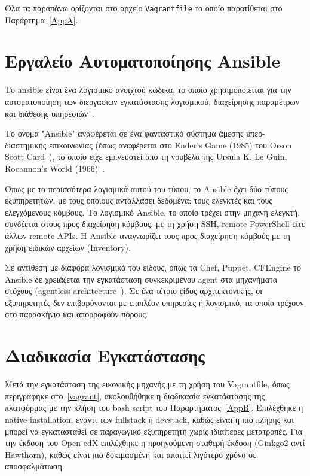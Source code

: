 \documentclass[12pt]{report}
\begin{document}
Όλα τα παραπάνω ορίζονται στο αρχείο \textlatin{\texttt{Vagrantfile}} το οποίο παρατίθεται στο Παράρτημα~\ref{AppA}.

\section{Εργαλείο Αυτοματοποίησης \textlatin{Ansible}}\label{ansible}
Το \textlatin{ansible} είναι ένα λογισμικό ανοιχτού κώδικα, το οποίο χρησιμοποιείται για την αυτοματοποίηση των διεργασιων εγκατάστασης λογισμικού, διαχείρησης παραμέτρων και διάθεσης υπηρεσιών~\cite{wikipedia_2019}.

Το όνομα \textlatin{"Ansible"} αναφέρεται σε ένα φανταστικό σύστημα άμεσης υπερ-διαστημικής επικοινωνίας (όπως αναφέρεται στο \textlatin{Ender's Game} (1985) του \textlatin{Orson Scott Card}~\cite{wikipedia_2019}), το οποίο είχε εμπνευστεί από τη νουβέλα της \textlatin{Ursula K. Le Guin, Rocannon's World (1966)}~\cite{worldcat}.

Όπως με τα περισσότερα λογισμικά αυτού του τύπου, το \textlatin{Ansible} έχει δύο τύπους εξυπηρετητών, με τους οποίους ανταλλάσει δεδομένα: τους ελεγκτές και τους ελεγχόμενους κόμβους. Το λογισμικό \textlatin{Ansible}, το οποίο τρέχει στην μηχανή ελεγκτή, συνδέεται στους προς διαχείρηση κόμβους, με τη χρήση \textlatin{SSH, remote PowerShell} είτε άλλων \textlatin{remote APIs}. Η \textlatin{Ansible} αναγνωρίζει τους προς διαχείρηση κόμβούς με τη χρήση ειδικών αρχείων (\textlatin{Inventory}).

Σε αντίθεση με διάφορα λογισμικά του είδους, όπως τα \textlatin{Chef, Puppet, CFEngine} το \textlatin{Ansible} δε χρειάζεται την εγκατάσταση συγκεκριμένου \textlatin{agent} στα μηχανήματα στόχους (\textlatin{agentless architecture}~\cite{wikipedia_2019}). Σε ένα τέτοιο είδος αρχιτεκτονικής, οι εξυπηρετητές δεν επιβαρύνονται με επιπλέον υπηρεσίες ή λογισμικό, τα οποία τρέχουν στο παρασκήνιο και απορροφούν πόρους.

\section{Διαδικασία Εγκατάστασης}
Μετά την εγκατάσταση της εικονικής μηχανής με τη χρήση του \textlatin{Vagrantfile}, όπως περιγράφηκε στο~\ref{vagrant}, ακολουθήθηκε η διαδικασία εγκατάστασης της πλατφόρμας με την κλήση του \textlatin{bash script} του Παραρτήματος~\ref{AppB}. Επιλέχθηκε η \textlatin{native installation}, έναντι των \textlatin{fullstack} ή \textlatin{devstack}, καθώς είναι η πιο πλήρης και μπορεί να εγκατασταθεί σε παραγωγικό εξυπηρετητή χωρίς ιδιαίτερες μετατροπές. Για την έκδοση του \textlatin{Open edX} επιλέχθηκε η προηγούμενη σταθερή έκδοση (\textlatin{Ginkgo2} αντί \textlatin{Hawthorn}), καθώς είναι πιο δοκιμασμένη και απαιτεί λιγότερο χρόνο σε αποσφαλμάτωση.
\end{document}
